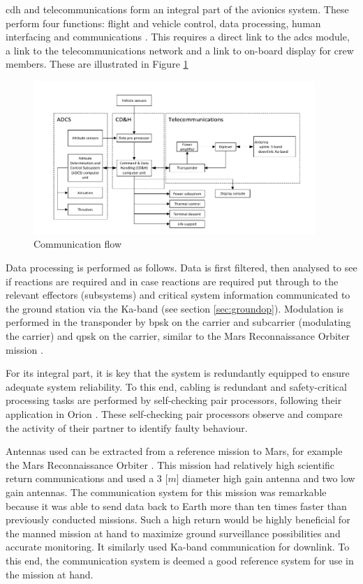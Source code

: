 \acrfull{cdh} and telecommunications form an integral part of the avionics system. These perform four functions: flight and vehicle control, data processing, human interfacing and communications \cite{Eger2008}. This requires a direct link to the \gls{adcs} module, a link to the telecommunications network and a link to on-board display for crew members. These are illustrated in Figure \ref{fig:cdhflow}

\begin{figure}[h]
		\centering
		\includegraphics[width=0.95\textwidth]{./Figure/CrewModule/CDH.pdf}
		\vspace{-12mm}
		\caption{Communication flow}
		\label{fig:cdhflow}
\end{figure}

Data processing is performed as follows. Data is first filtered, then analysed to see if reactions are required and in case reactions are required put through to the relevant effectors (subsystems) and critical system information communicated to the ground station via the Ka-band (see section \ref{sec:groundop}). Modulation is performed in the transponder by \gls{bpsk} on the carrier and subcarrier (modulating the carrier) and \gls{qpsk} on the carrier, similar to the Mars Reconnaissance Orbiter mission \cite{Taylor2006}.

For its integral part, it is key that the system is redundantly equipped to ensure adequate system reliability. To this end, cabling is redundant and safety-critical processing tasks are performed by self-checking pair processors, following their application in Orion \cite{Eger2008}. These self-checking pair processors observe and compare the activity of their partner to identify faulty behaviour. 

Antennas used can be extracted from a reference mission to Mars, for example the Mars Reconnaissance Orbiter \cite{Taylor2006}. This mission had relatively high scientific return communications and used a $3$ [$m$] diameter high gain antenna and two low gain antennas. The communication system for this mission was remarkable because it was able to send data back to Earth more than ten times faster than previously conducted missions. Such a high return would be highly beneficial for the manned mission at hand to maximize ground surveillance possibilities and accurate monitoring. It similarly used Ka-band communication for downlink. To this end, the communication system is deemed a good reference system for use in the mission at hand.

